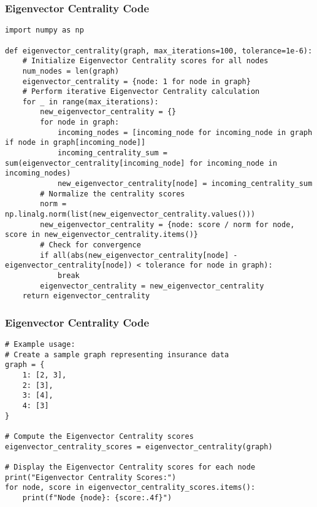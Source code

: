 \begin{frame}[fragile]\frametitle{Eigenvector Centrality Code}
\begin{lstlisting}[basicstyle=\tiny]
import numpy as np

def eigenvector_centrality(graph, max_iterations=100, tolerance=1e-6):
    # Initialize Eigenvector Centrality scores for all nodes
    num_nodes = len(graph)
    eigenvector_centrality = {node: 1 for node in graph}
    # Perform iterative Eigenvector Centrality calculation
    for _ in range(max_iterations):
        new_eigenvector_centrality = {}
        for node in graph:
            incoming_nodes = [incoming_node for incoming_node in graph if node in graph[incoming_node]]
            incoming_centrality_sum = sum(eigenvector_centrality[incoming_node] for incoming_node in incoming_nodes)
            new_eigenvector_centrality[node] = incoming_centrality_sum
        # Normalize the centrality scores
        norm = np.linalg.norm(list(new_eigenvector_centrality.values()))
        new_eigenvector_centrality = {node: score / norm for node, score in new_eigenvector_centrality.items()}
        # Check for convergence
        if all(abs(new_eigenvector_centrality[node] - eigenvector_centrality[node]) < tolerance for node in graph):
            break
        eigenvector_centrality = new_eigenvector_centrality
    return eigenvector_centrality
\end{lstlisting}

\end{frame}



\begin{frame}[fragile]\frametitle{Eigenvector Centrality Code}
\begin{lstlisting}[basicstyle=\tiny]
# Example usage:
# Create a sample graph representing insurance data
graph = {
    1: [2, 3],
    2: [3],
    3: [4],
    4: [3]
}

# Compute the Eigenvector Centrality scores
eigenvector_centrality_scores = eigenvector_centrality(graph)

# Display the Eigenvector Centrality scores for each node
print("Eigenvector Centrality Scores:")
for node, score in eigenvector_centrality_scores.items():
    print(f"Node {node}: {score:.4f}")

\end{lstlisting}

\end{frame}


